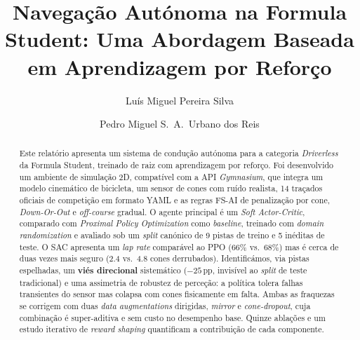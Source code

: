 \documentclass[runningheads]{llncs}
\begin{document}
\sloppy

\title{Navegação Autónoma na Formula Student: Uma Abordagem Baseada em Aprendizagem por Reforço}

\author{Luís Miguel Pereira Silva \and
Pedro Miguel S.\ A.\ Urbano dos Reis}



\maketitle

\begin{abstract}
Este relatório apresenta um sistema de condução autónoma para a categoria \textit{Driverless} da Formula Student, treinado de raiz com aprendizagem por reforço. Foi desenvolvido um ambiente de simulação 2D, compatível com a API \textit{Gymnasium}, que integra um modelo cinemático de bicicleta, um sensor de cones com ruído realista, 14 traçados oficiais de competição em formato YAML e as regras FS-AI de penalização por cone, \textit{Down-Or-Out} e \textit{off-course} gradual. O agente principal é um \textit{Soft Actor-Critic}, comparado com \textit{Proximal Policy Optimization} como \textit{baseline}, treinado com \textit{domain randomization} e avaliado sob um \textit{split} canónico de 9 pistas de treino e 5 inéditas de teste. O SAC apresenta um \textit{lap rate} comparável ao PPO (66\% vs.\ 68\%) mas é cerca de duas vezes mais seguro (2.4 vs.\ 4.8 cones derrubados). Identificámos, via pistas espelhadas, um \textbf{viés direcional} sistemático ($-25$\,pp, invisível ao \textit{split} de teste tradicional) e uma assimetria de robustez de perceção: a política tolera falhas transientes do sensor mas colapsa com cones fisicamente em falta. Ambas as fraquezas se corrigem com duas \textit{data augmentations} dirigidas, \textit{mirror} e \textit{cone-dropout}, cuja combinação é super-aditiva e sem custo no desempenho base. Quinze ablações e um estudo iterativo de \textit{reward shaping} quantificam a contribuição de cada componente.
\end{abstract}
\end{document}
